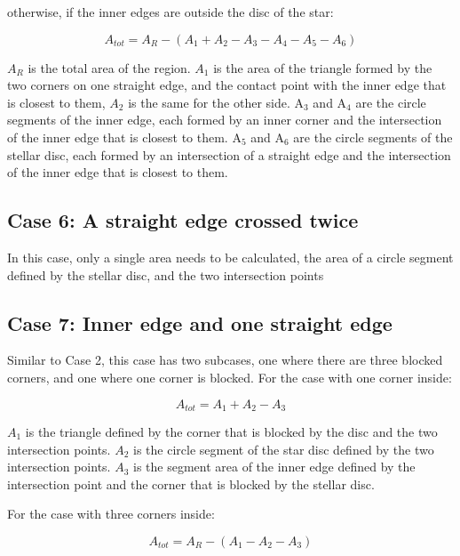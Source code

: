 \documentclass[a4paper,fleqn,usenatbib]{mnras}
\begin{document}
otherwise, if the inner edges are outside the disc of the star:

\begin{equation} \label{eq:inner_outer}
A_{tot} = A_R - (A_1 + A_2 - A_3 - A_4 - A_5 - A_6)
\end{equation}

$A_R$ is the total area of the region. $A_1$ is the area of the triangle formed by the two corners on one straight edge, and the contact point with the inner edge that is closest to them, $A_2$ is the same for the other side. A$_3$ and A$_4$ are the circle segments of the inner edge, each formed by an inner corner and the intersection of the inner edge that is closest to them. A$_5$ and A$_6$ are the circle segments of the stellar disc, each formed by an intersection of a straight edge and the intersection of the inner edge that is closest to them.

\subsection*{Case 6: A straight edge crossed twice}

In this case, only a single area needs to be calculated, the area of a circle segment defined by the stellar disc, and the two intersection points

\subsection*{Case 7: Inner edge and one straight edge}

Similar to Case 2, this case has two subcases, one where there are three blocked corners, and one where one corner is blocked. For the case with one corner inside:

\begin{equation} \label{eq:inner_outer}
A_{tot} = A_1 + A_2 - A_3
\end{equation}

$A_1$ is the triangle defined by the corner that is blocked by the disc and the two intersection points. $A_2$ is the circle segment of the star disc defined by the two intersection points. $A_3$ is the segment area of the inner edge defined by the intersection point and the corner that is blocked by the stellar disc.

For the case with three corners inside:

\begin{equation} \label{eq:inner_outer}
A_{tot} = A_R - (A_1 - A_2 - A_3)
\end{equation}
\end{document}
